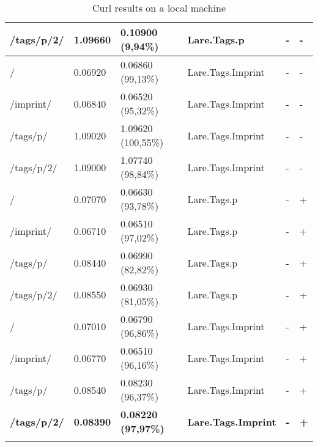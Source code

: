 \begin{center}
\begin{longtable}{llllll}
    \textbf{/tags/p/2/} & \textbf{1.09660} & \textbf{0.10900 (9,94\%)} & \textbf{Lare.Tags.p} & \textbf{-} & \textbf{-}\\
    \hline
	/ & 0.06920 & 0.06860 (99,13\%) & Lare.Tags.Imprint & - & - \\
	/imprint/ & 0.06840 & 0.06520 (95,32\%) & Lare.Tags.Imprint & - & - \\
	/tags/p/ & 1.09020 & 1.09620 (100,55\%) & Lare.Tags.Imprint & - & - \\
	/tags/p/2/ & 1.09000 & 1.07740 (98,84\%) & Lare.Tags.Imprint & - & - \\
	\hline
	\hline
	/ & 0.07070 & 0.06630 (93,78\%) & Lare.Tags.p & - & + \\
	/imprint/ & 0.06710 & 0.06510 (97,02\%) & Lare.Tags.p & - & + \\
	/tags/p/ & 0.08440 & 0.06990 (82,82\%) & Lare.Tags.p & - & + \\
	/tags/p/2/ & 0.08550 & 0.06930 (81,05\%) & Lare.Tags.p & - & + \\
	\hline
	/ & 0.07010 & 0.06790 (96,86\%) & Lare.Tags.Imprint & - & + \\
	/imprint/ & 0.06770 & 0.06510 (96,16\%) & Lare.Tags.Imprint & - & + \\
	/tags/p/ & 0.08540 & 0.08230 (96,37\%) & Lare.Tags.Imprint & - & + \\
	\textbf{/tags/p/2/} & \textbf{0.08390} & \textbf{0.08220 (97,97\%)} & \textbf{Lare.Tags.Imprint} & \textbf{-} & \textbf{+} \\
	\hline
\caption{Curl results on a local machine}
\label{tab:curl_results_local}
\end{longtable}
\end{center}



